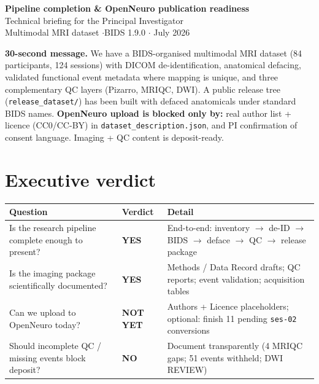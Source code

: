 \documentclass[11pt,a4paper]{article}
\begin{document}
\begin{center}
{\LARGE\bfseries Pipeline completion \& OpenNeuro publication readiness}\\[6pt]
{\large Technical briefing for the Principal Investigator}\\[4pt]
{\normalsize Multimodal MRI dataset \quad$\cdot$\quad BIDS 1.9.0 \quad$\cdot$ July 2026}
\end{center}

\vspace{2mm}
\noindent\colorbox{soft}{\parbox{\dimexpr\textwidth-2\fboxsep\relax}{%
\textbf{30-second message.}
We have a BIDS-organised multimodal MRI dataset (84 participants, 124 sessions) with
DICOM de-identification, anatomical defacing, validated functional event metadata where
mapping is unique, and three complementary QC layers (Pizarro, MRIQC, DWI).
A public release tree (\texttt{release\_dataset/}) has been built with defaced anatomicals
under standard BIDS names.
\textbf{OpenNeuro upload is blocked only by:} real author list + licence (CC0/CC-BY) in
\texttt{dataset\_description.json}, and PI confirmation of consent language.
Imaging + QC content is deposit-ready.
}}

\section{Executive verdict}

\begin{center}
\begin{tabularx}{\textwidth}{@{}lYY@{}}
\toprule
\textbf{Question} & \textbf{Verdict} & \textbf{Detail} \\
\midrule
Is the research pipeline complete enough to present? &
\textcolor{ok}{\textbf{YES}} &
End-to-end: inventory $\rightarrow$ de-ID $\rightarrow$ BIDS $\rightarrow$ deface $\rightarrow$ QC $\rightarrow$ release package \\
Is the imaging package scientifically documented? &
\textcolor{ok}{\textbf{YES}} &
Methods / Data Record drafts; QC reports; event validation; acquisition tables \\
Can we upload to OpenNeuro today? &
\textcolor{warn}{\textbf{NOT YET}} &
Authors + Licence placeholders; optional: finish 11 pending \texttt{ses-02} conversions \\
Should incomplete QC / missing events block deposit? &
\textcolor{ok}{\textbf{NO}} &
Document transparently (4 MRIQC gaps; 51 events withheld; DWI REVIEW) \\
\bottomrule
\end{tabularx}
\end{center}
\end{document}
